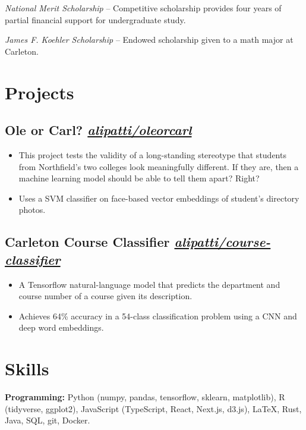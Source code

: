 \documentclass{ali-resume}
\begin{document}
\textit{National Merit Scholarship} -- Competitive scholarship provides four years of partial financial support for undergraduate study.

\textit{James F. Koehler Scholarship} -- Endowed scholarship given to a math major at Carleton.

\section{Projects}

\newcommand{\project}[2]{%
	\subsection{#1
		\hfill
		\normalfont \small \faicon{github}
		\href{http://github.com/alipatti/#2}{\textit{alipatti/#2}}
	}}

\project{Ole or Carl?}{oleorcarl}

\begin{itemize}
	\item This project tests the validity of a long-standing stereotype that students from Northfield's two colleges look meaningfully different. If they are, then a machine learning model should be able to tell them apart? Right?
	\item Uses a SVM classifier on face-based vector embeddings of student's directory photos.
\end{itemize}

\project{Carleton Course Classifier}{course-classifier}

\begin{itemize}
	\item A Tensorflow natural-language model that predicts the department and course number of a course given its description. \item Achieves 64\% accuracy in a 54-class classification problem using a CNN and deep word embeddings.
\end{itemize}

\section{Skills}

\textbf{Programming:}
Python (numpy, pandas, tensorflow, sklearn, matplotlib), R (tidyverse, ggplot2), JavaScript (TypeScript, React, Next.js, d3.js), \LaTeX, Rust, Java, SQL, git, Docker.
\end{document}
